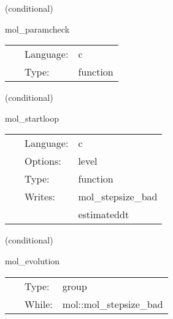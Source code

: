 \vspace{5mm}

   (conditional) 

\hspace{5mm} mol\_paramcheck 

\hspace{5mm}{\it basic parameter checking } 


\hspace{5mm}

 \begin{tabular*}{160mm}{cll} 
~ & Language:  & c \\ 
~ & Type:  & function \\ 
\end{tabular*} 


\vspace{5mm}

   (conditional) 

\hspace{5mm} mol\_startloop 

\hspace{5mm}{\it initialise the step size control } 


\hspace{5mm}

 \begin{tabular*}{160mm}{cll} 
~ & Language:  & c \\ 
~ & Options:  & level \\ 
~ & Type:  & function \\ 
~ & Writes:  & mol\_stepsize\_bad \\ 
~& ~ &estimateddt\\ 
\end{tabular*} 


\vspace{5mm}

   (conditional) 

\hspace{5mm} mol\_evolution 

\hspace{5mm}{\it a single cactus evolution step using mol } 


\hspace{5mm}

 \begin{tabular*}{160mm}{cll} 
~ & Type:  & group \\ 
~ & While:  & mol::mol\_stepsize\_bad \\ 
\end{tabular*} 


